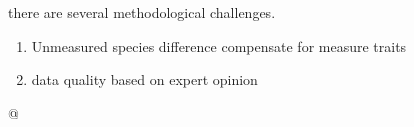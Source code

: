 \documentclass{article}\usepackage[]{graphicx}\usepackage[]{color}
\begin{document}
there are several methodological challenges.


\begin{enumerate}
\item Unmeasured species difference compensate for measure traits
\item data quality based on expert opinion
\end{enumerate}








@






\end{document}

